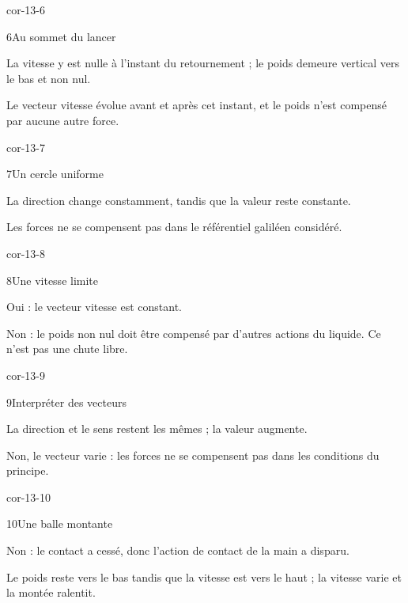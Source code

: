 \begin{blocLivre}{cor-13-6}\begin{corrige}{6}{Au sommet du lancer}
\begin{questions}
\item La vitesse y est nulle à l’instant du retournement ; le poids demeure vertical vers le bas et non nul.
\item Le vecteur vitesse évolue avant et après cet instant, et le poids n’est compensé par aucune autre force.
\end{questions}
\end{corrige}\end{blocLivre}
\begin{blocLivre}{cor-13-7}\begin{corrige}{7}{Un cercle uniforme}
\begin{questions}
\item La direction change constamment, tandis que la valeur reste constante.
\item Les forces ne se compensent pas dans le référentiel galiléen considéré.
\end{questions}
\end{corrige}\end{blocLivre}
\begin{blocLivre}{cor-13-8}\begin{corrige}{8}{Une vitesse limite}
\begin{questions}
\item Oui : le vecteur vitesse est constant.
\item Non : le poids non nul doit être compensé par d’autres actions du liquide. Ce n’est pas une chute libre.
\end{questions}
\end{corrige}\end{blocLivre}
\begin{blocLivre}{cor-13-9}\begin{corrige}{9}{Interpréter des vecteurs}
\begin{questions}
\item La direction et le sens restent les mêmes ; la valeur augmente.
\item Non, le vecteur varie : les forces ne se compensent pas dans les conditions du principe.
\end{questions}
\end{corrige}\end{blocLivre}
\begin{blocLivre}{cor-13-10}\begin{corrige}{10}{Une balle montante}
\begin{questions}
\item Non : le contact a cessé, donc l’action de contact de la main a disparu.
\item Le poids reste vers le bas tandis que la vitesse est vers le haut ; la vitesse varie et la montée ralentit.
\end{questions}
\end{corrige}\end{blocLivre}
